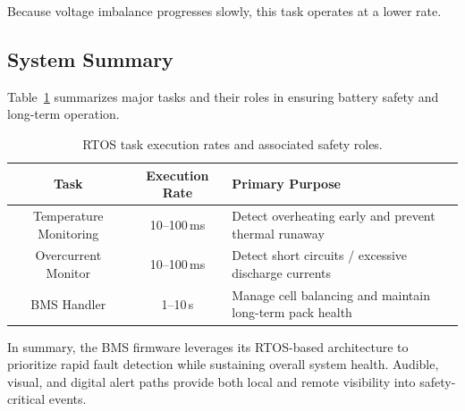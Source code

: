 \documentclass[12pt]{article}
\begin{document}
Because voltage imbalance progresses slowly, this task operates at a lower rate.

\subsection{System Summary}

Table~\ref{tab:task_rates} summarizes major tasks and their roles in ensuring battery safety and long-term operation.

\begin{table}[h!]
\centering
\begin{tabular}{|c|c|p{7cm}|}
\hline
\textbf{Task} & \textbf{Execution Rate} & \textbf{Primary Purpose} \\
\hline
Temperature Monitoring & 10--100\,\si{ms} & Detect overheating early and prevent thermal runaway \\
\hline
Overcurrent Monitor & 10--100\,\si{ms} & Detect short circuits / excessive discharge currents \\
\hline
BMS Handler & 1--10\,\si{s} & Manage cell balancing and maintain long-term pack health \\
\hline
\end{tabular}
\caption{RTOS task execution rates and associated safety roles.}
\label{tab:task_rates}
\end{table}

In summary, the BMS firmware leverages its RTOS-based architecture to prioritize rapid fault detection while sustaining overall system health. Audible, visual, and digital alert paths provide both local and remote visibility into safety-critical events.
\end{document}
